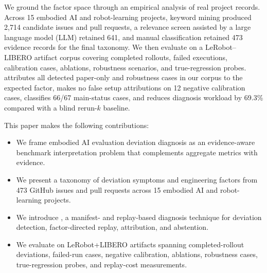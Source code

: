 We ground the factor space through an empirical analysis of real project records. Across 15 embodied AI and robot-learning projects, keyword mining produced 2,714 candidate issues and pull requests, a relevance screen assisted by a large language model (LLM) retained 641, and manual classification retained 473 evidence records for the final taxonomy. We then evaluate \sys on a LeRobot--LIBERO artifact corpus covering completed rollouts, failed executions, calibration cases, ablations, robustness scenarios, and true-regression probes. \sys attributes all detected paper-only and robustness cases in our corpus to the expected factor, makes no false setup attributions on 12 negative calibration cases, classifies 66/67 main-status cases, and reduces diagnosis workload by 69.3\% compared with a blind rerun-$k$ baseline.

This paper makes the following contributions:
\begin{itemize}
  \item We frame embodied AI evaluation deviation diagnosis as an evidence-aware benchmark interpretation problem that complements aggregate metrics with evidence.
  \item We present a taxonomy of deviation symptoms and engineering factors from 473 GitHub issues and pull requests across 15 embodied AI and robot-learning projects.
  \item We introduce \sys, a manifest- and replay-based diagnosis technique for deviation detection, factor-directed replay, attribution, and abstention.
  \item We evaluate \sys on LeRobot+LIBERO artifacts spanning completed-rollout deviations, failed-run cases, negative calibration, ablations, robustness cases, true-regression probes, and replay-cost measurements.
\end{itemize}
